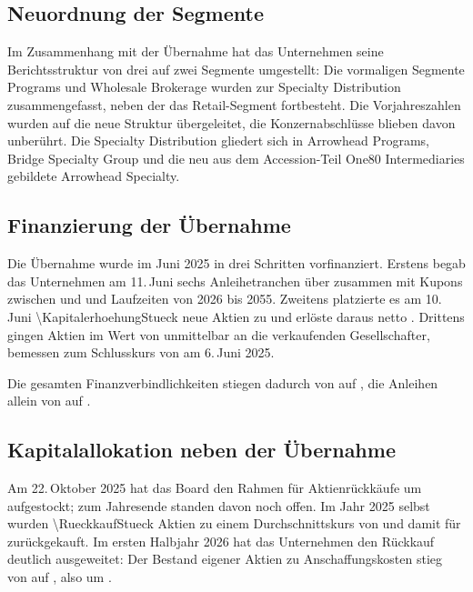 \subsection{Neuordnung der Segmente}

Im Zusammenhang mit der \"Ubernahme hat das Unternehmen seine Berichtsstruktur
von drei auf zwei Segmente umgestellt: Die vormaligen Segmente Programs und
Wholesale Brokerage wurden zur Specialty Distribution zusammengefasst,
neben der das Retail-Segment fortbesteht. Die Vorjahreszahlen wurden auf
die neue Struktur \"ubergeleitet, die Konzernabschl\"usse blieben davon
unber\"uhrt. Die Specialty Distribution gliedert sich in
Arrowhead Programs, Bridge Specialty Group und die neu aus dem
Accession-Teil One80 Intermediaries gebildete Arrowhead
Specialty.

\subsection{Finanzierung der \"Ubernahme}
\label{sec:finanzierung}

Die \"Ubernahme wurde im Juni 2025 in drei Schritten vorfinanziert. Erstens
begab das Unternehmen am 11.\,Juni sechs Anleihetranchen \"uber zusammen
\MioUSDexakt{\AnleihevolumenNeu} mit Kupons zwischen \Pct{\KuponMin} und
\Pct{\KuponMax} und Laufzeiten von 2026 bis 2055.
Zweitens platzierte es am 10.\,Juni \num{\KapitalerhoehungStueck} neue
Aktien zu \USDje{\KapitalerhoehungKurs} und erl\"oste daraus netto
\MioUSDexakt{\KapitalerhoehungNetto}. Drittens gingen Aktien im Wert von
\MioUSDexakt{\VerkaeuferaktienWert} unmittelbar an die verkaufenden
Gesellschafter, bemessen zum Schlusskurs von
\USDje{\VerkaeuferaktienKurs} am 6.\,Juni 2025.

Die gesamten Finanzverbindlichkeiten stiegen dadurch von
\MioUSDexakt{\GesamtverschuldungVJ} auf
\MioUSDexakt{\Gesamtverschuldung}, die Anleihen allein von
\MioUSDexakt{\AnleihenVJ} auf \MioUSDexakt{\Anleihen}.

\subsection{Kapitalallokation neben der \"Ubernahme}

Am 22.\,Oktober 2025 hat das Board den Rahmen f\"ur Aktienr\"uckk\"aufe um
\MioUSDexakt{\RueckkaufAufstockung} aufgestockt; zum Jahresende standen davon noch
\MioUSDexakt{\RueckkaufRahmen} offen. Im Jahr 2025 selbst wurden
\num{\RueckkaufStueck} Aktien zu einem Durchschnittskurs von
\USDje{\RueckkaufKurs} und damit f\"ur \MioUSDexakt{\AktienrueckkaufCF}
zur\"uckgekauft. Im ersten Halbjahr 2026 hat das
Unternehmen den R\"uckkauf deutlich ausgeweitet: Der Bestand eigener Aktien
zu Anschaffungskosten stieg von \MioUSDexakt{\HJEigeneAktienVJ} auf
\MioUSDexakt{\HJEigeneAktien}, also um
\MioUSDexakt{\HJEigeneAktienZuwachs}.

